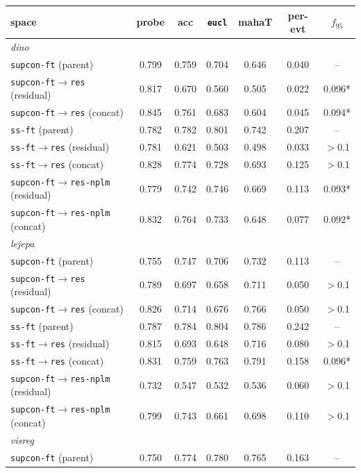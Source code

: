 \documentclass{article}
\begin{document}
\begin{table}[p]\centering\small
\setlength{\tabcolsep}{4pt}
\begin{tabular}{lcccccc}
\toprule
space & probe & acc & \texttt{eucl} & mahaT & per-evt & $f_{95}$ \\
\midrule
\multicolumn{7}{l}{\emph{dino}}\\
\texttt{supcon-ft} (parent) & 0.799 & 0.759 & 0.704 & 0.646 & 0.040 & -- \\
\texttt{supcon-ft$\to$res} (residual) & 0.817 & 0.670 & 0.560 & 0.505 & 0.022 & 0.096* \\
\texttt{supcon-ft$\to$res} (concat) & 0.845 & 0.761 & 0.683 & 0.604 & 0.045 & 0.094* \\
\texttt{ss-ft} (parent) & 0.782 & 0.782 & 0.801 & 0.742 & 0.207 & -- \\
\texttt{ss-ft$\to$res} (residual) & 0.781 & 0.621 & 0.503 & 0.498 & 0.033 & $>$0.1 \\
\texttt{ss-ft$\to$res} (concat) & 0.828 & 0.774 & 0.728 & 0.693 & 0.125 & $>$0.1 \\
\texttt{supcon-ft$\to$res-nplm} (residual) & 0.779 & 0.742 & 0.746 & 0.669 & 0.113 & 0.093* \\
\texttt{supcon-ft$\to$res-nplm} (concat) & 0.832 & 0.764 & 0.733 & 0.648 & 0.077 & 0.092* \\
\multicolumn{7}{l}{\emph{lejepa}}\\
\texttt{supcon-ft} (parent) & 0.755 & 0.747 & 0.706 & 0.732 & 0.113 & -- \\
\texttt{supcon-ft$\to$res} (residual) & 0.789 & 0.697 & 0.658 & 0.711 & 0.050 & $>$0.1 \\
\texttt{supcon-ft$\to$res} (concat) & 0.826 & 0.714 & 0.676 & 0.766 & 0.050 & $>$0.1 \\
\texttt{ss-ft} (parent) & 0.787 & 0.784 & 0.804 & 0.786 & 0.242 & -- \\
\texttt{ss-ft$\to$res} (residual) & 0.815 & 0.693 & 0.648 & 0.716 & 0.080 & $>$0.1 \\
\texttt{ss-ft$\to$res} (concat) & 0.831 & 0.759 & 0.763 & 0.791 & 0.158 & 0.096* \\
\texttt{supcon-ft$\to$res-nplm} (residual) & 0.732 & 0.547 & 0.532 & 0.536 & 0.060 & $>$0.1 \\
\texttt{supcon-ft$\to$res-nplm} (concat) & 0.799 & 0.743 & 0.661 & 0.698 & 0.110 & $>$0.1 \\
\multicolumn{7}{l}{\emph{visreg}}\\
\texttt{supcon-ft} (parent) & 0.750 & 0.774 & 0.780 & 0.765 & 0.163 & -- \\

\end{tabular}
\end{table}
\end{document}
